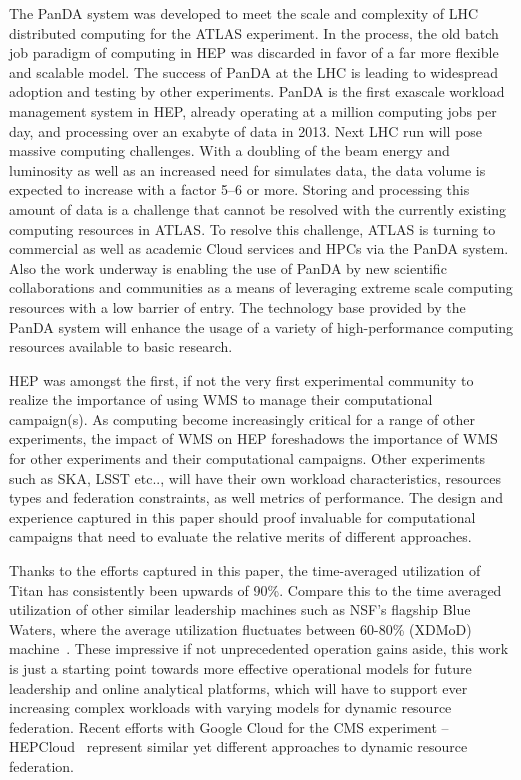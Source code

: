 The PanDA  system was developed to meet the scale and complexity of LHC
distributed computing for the ATLAS experiment.  In the process,  the old batch
job paradigm  of computing in HEP was  discarded  in favor of a  far more
flexible and scalable  model. The success  of PanDA  at the LHC is leading to
widespread adoption and testing by other experiments. PanDA  is the first
exascale  workload management system in HEP, already operating at a million
computing jobs per day, and processing over an exabyte of data in 2013. Next LHC
run will pose massive computing  challenges. With a  doubling of the beam
energy  and luminosity as  well as an increased  need for  simulates  data, the
data volume is expected to increase with a factor 5--6 or more. Storing and
processing  this amount of data is a  challenge   that cannot be resolved with
the currently existing  computing  resources in ATLAS\@. To resolve this
challenge, ATLAS is turning to commercial  as well as academic Cloud services
and HPCs via the PanDA system. Also the work underway is enabling the use of
PanDA by new scientific collaborations and communities as a means  of leveraging
extreme scale computing  resources with a low barrier of entry. The technology
base provided by the PanDA system will enhance the usage of a variety  of
high-performance computing resources available to basic research.

HEP was amongst the first, if not the very first experimental community to
realize the importance of using WMS to manage their computational campaign(s).
As computing become increasingly critical for a range of other experiments,
the impact of WMS on HEP foreshadows the importance of WMS for other
experiments and their computational campaigns. Other experiments such as SKA,
LSST etc.., will have their own workload characteristics, resources types and
federation constraints, as well metrics of performance.  The design and
experience captured in this paper should proof invaluable for computational
campaigns that need to evaluate the relative merits of different approaches.

Thanks to the efforts captured in this paper, the time-averaged utilization of
Titan has consistently been upwards of 90\%. Compare this to the time averaged
utilization of other similar leadership machines such as NSF's flagship Blue
Waters, where the average utilization fluctuates between 60-80\% (XDMoD)
machine~\cite{bw-sucks}. These impressive if not unprecedented operation gains
aside, this work is just a starting point towards more effective operational
models for future leadership and online analytical platforms\cite{foap-url},
which will have to support ever increasing complex workloads with varying
models for dynamic resource federation. Recent efforts with Google Cloud for
the CMS experiment -- HEPCloud~\cite{hepcloud,google-hep} represent similar
yet different approaches to dynamic resource federation.

